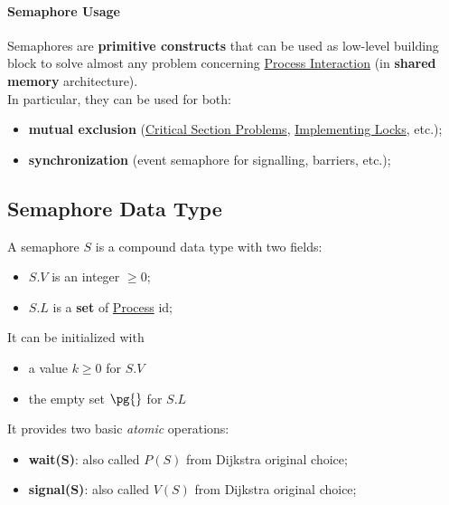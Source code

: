 \paragraph{Semaphore Usage}\label{par:pi_semaphore_usage} %
Semaphores are \textbf{primitive constructs} that can be used as low-level building block to solve almost any problem concerning \hyperref[sub:cp_process_interaction]{Process Interaction} (in \textbf{shared memory} architecture).
\\
In particular, they can be used for both:
\begin{itemize}
    \item \textbf{mutual exclusion} (\hyperref[sec:cp_the_critical_section_problem]{Critical Section Problems}, \hyperref[sub:cp_locks]{Implementing Locks}, etc.);
    \item \textbf{synchronization} (event semaphore for signalling, barriers, etc.);
\end{itemize}
%
\subsection{Semaphore Data Type}\label{sub:cp_semaphore_data_type} %
A semaphore $S$ is a compound data type with two fields:
\begin{itemize}
    \item $S.V$ is an integer $\ge 0$;
    \item $S.L$ is a \textbf{set} of \hyperref[def:process]{Process} id;
\end{itemize}
It can be initialized with
\begin{itemize}
    \item a value $k \ge 0$ for $S.V$
    \item the empty set $\pg{}$ for $S.L$
\end{itemize}
\begin{note}
    It provides two basic \textit{atomic} operations:
    \begin{itemize}
        \item \textbf{wait(S)}: also called $P(S)$ from Dijkstra original choice;
        \item \textbf{signal(S)}: also called $V(S)$ from Dijkstra original choice;
    \end{itemize}
\end{note}
%

